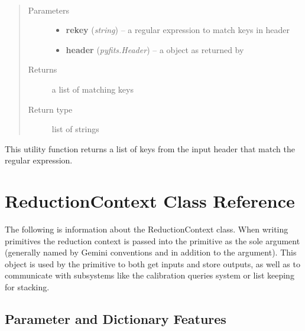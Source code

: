 \documentclass[letterpaper,10pt,english]{sphinxmanual}
\begin{document}
\begin{fulllineitems}
\label{chapter_AstroDataClass:astrodata.data.re_header_keys}~\begin{quote}\begin{description}
\item[{Parameters}] \leavevmode\begin{itemize}
\item {} 
\textbf{rekey} (\emph{string}) -- a regular expression to match keys in header

\item {} 
\textbf{header} (\emph{pyfits.Header}) -- a  object as returned by 

\end{itemize}

\item[{Returns}] \leavevmode
a list of matching keys

\item[{Return type}] \leavevmode
list of strings

\end{description}\end{quote}

This utility function returns a list of keys from 
the input header that match the regular expression.

\end{fulllineitems}



\chapter{ReductionContext Class Reference}
\label{chapter_ReductionContextClass:reductioncontext-class-reference}\label{chapter_ReductionContextClass::doc}
The following is information about the ReductionContext class. When writing
primitives the reduction context is passed into the primitive as the sole
argument (generally named  by
Gemini conventions and in addition to the  argument).
This object is used by the primitive to both get inputs
and store outputs, as well as to communicate with subsystems
like the calibration queries system or list keeping for stacking.


\section{Parameter and Dictionary Features}
\label{chapter_ReductionContextClass:parameter-and-dictionary-features}
\end{document}
